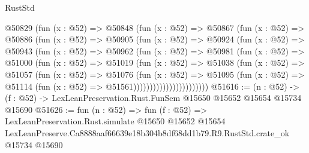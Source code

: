 \begin{lexlean}{RustStd}
\begin{coremodule}
                @50829
                  (fun (x : @52) =>
                  @50848
                    (fun (x : @52) =>
                    @50867
                      (fun (x : @52) =>
                      @50886
                        (fun (x : @52) =>
                        @50905
                          (fun (x : @52) =>
                          @50924
                            (fun (x : @52) =>
                            @50943
                              (fun (x : @52) =>
                              @50962
                                (fun (x : @52) =>
                                @50981
                                  (fun (x : @52) =>
                                  @51000
                                    (fun (x : @52) =>
                                    @51019
                                      (fun (x : @52) =>
                                      @51038
                                        (fun (x : @52) =>
                                        @51057
                                          (fun (x : @52) =>
                                          @51076
                                            (fun (x : @52) =>
                                            @51095
                                              (fun (x : @52) =>
                                              @51114 (fun (x : @52) => @51561)))))))))))))))))))))))
@51616 := (n : @52) ->
  (f : @52) -> LexLeanPreservation.Rust.FunSem @15650 @15652 @15654 @15734 @15690
@51626 := fun (n : @52) =>
  fun (f : @52) =>
  LexLeanPreservation.Rust.simulate
    @15650
    @15652
    @15654
    LexLeanPreserve.Ca8888aaf66639e18b304b8df68dd1b79.R9.RustStd.crate_ok
    @15734
    @15690
\end{coremodule}
\end{lexlean}
